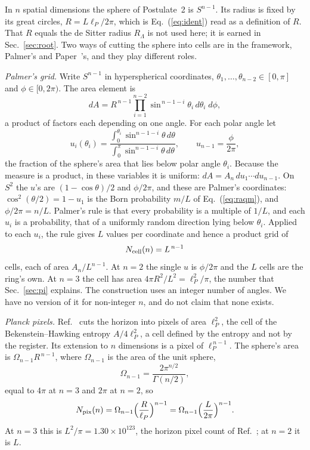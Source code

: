 \documentclass[aps,prd,twocolumn,superscriptaddress,nofootinbib]{revtex4-2}
\begin{document}
In $n$ spatial dimensions the sphere of Postulate~2 is $S^{n-1}$. Its radius is fixed by its great circles, $R = L\ell_P/2\pi$, which is Eq.~(\ref{eq:ident}) read as a definition of $R$. That $R$ equals the de Sitter radius $R_\Lambda$ is not used here; it is earned in Sec.~\ref{sec:root}. Two ways of cutting the sphere into cells are in the framework, Palmer's and Paper~\cite{korytko2026}'s, and they play different roles.

\textit{Palmer's grid.} Write $S^{n-1}$ in hyperspherical coordinates, $\theta_1,\dots,\theta_{n-2}\in[0,\pi]$ and $\phi\in[0,2\pi)$. The area element is
\begin{equation}
dA = R^{\,n-1}\prod_{i=1}^{n-2}\sin^{\,n-1-i}\theta_i\,d\theta_i\;d\phi,
\label{eq:dA}
\end{equation}
a product of factors each depending on one angle. For each polar angle let
\begin{equation}
u_i(\theta_i) = \frac{\int_0^{\theta_i}\sin^{n-1-i}\theta\,d\theta}{\int_0^{\pi}\sin^{n-1-i}\theta\,d\theta},\qquad u_{n-1} = \frac{\phi}{2\pi},
\label{eq:u}
\end{equation}
the fraction of the sphere's area that lies below polar angle $\theta_i$. Because the measure is a product, in these variables it is uniform: $dA = A_n\,du_1\cdots du_{n-1}$. On $S^2$ the $u$'s are $(1-\cos\theta)/2$ and $\phi/2\pi$, and these are Palmer's coordinates: $\cos^2(\theta/2) = 1 - u_1$ is the Born probability $m/L$ of Eq.~(\ref{eq:raqm}), and $\phi/2\pi = n/L$. Palmer's rule is that every probability is a multiple of $1/L$, and each $u_i$ is a probability, that of a uniformly random direction lying below $\theta_i$. Applied to each $u_i$, the rule gives $L$ values per coordinate and hence a product grid of
\begin{equation}
N_{\rm cell}(n) = L^{\,n-1}
\label{eq:cells}
\end{equation}
cells, each of area $A_n/L^{n-1}$. At $n=2$ the single $u$ is $\phi/2\pi$ and the $L$ cells are the ring's own. At $n=3$ the cell has area $4\pi R^2/L^2 = \ell_P^2/\pi$, the number that Sec.~\ref{sec:pi} explains. The construction uses an integer number of angles. We have no version of it for non-integer $n$, and do not claim that none exists.

\textit{Planck pixels.} Ref.~\cite{korytko2026} cuts the horizon into pixels of area $\ell_P^2$, the cell of the Bekenstein--Hawking entropy $A/4\ell_P^2$, a cell defined by the entropy and not by the register. Its extension to $n$ dimensions is a pixel of $\ell_P^{\,n-1}$. The sphere's area is $\Omega_{n-1}R^{\,n-1}$, where $\Omega_{n-1}$ is the area of the unit sphere,
\begin{equation}
\Omega_{n-1} = \frac{2\pi^{n/2}}{\Gamma(n/2)},
\label{eq:omega}
\end{equation}
equal to $4\pi$ at $n=3$ and $2\pi$ at $n=2$, so
\begin{equation}
N_{\rm pix}(n) = \Omega_{n-1}\Big(\frac{R}{\ell_P}\Big)^{n-1} = \Omega_{n-1}\Big(\frac{L}{2\pi}\Big)^{n-1}.
\label{eq:supply}
\end{equation}
At $n=3$ this is $L^2/\pi = 1.30\times10^{123}$, the horizon pixel count of Ref.~\cite{korytko2026c}; at $n=2$ it is $L$.
\end{document}
